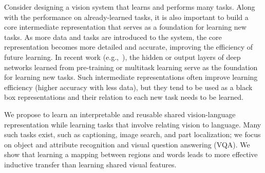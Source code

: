 \documentclass[10pt,twocolumn,letterpaper]{article}
\begin{document}
    

Consider designing a vision system that learns and performs many tasks.  Along with the performance on already-learned tasks, it is also important to build a core intermediate representation that serves as a foundation for learning new tasks.  As more data and tasks are introduced to the system, the core representation becomes more detailed and accurate, improving the efficiency of future learning.  In recent work (e.g.,~\cite{li2016learning,lu2016hierarchical,jabri2016revisiting,fukui2016multimodal,shih2016look,ilievski2016focused}), the hidden or output layers of deep networks learned from pre-training or multitask learning serve as the foundation for learning new tasks.  Such intermediate representations often improve learning efficiency (higher accuracy with less data), but they tend to be used as a black box representations and their relation to each new task needs to be learned.



We propose to learn an interpretable and reusable shared vision-language representation while learning tasks that involve relating vision to language.  Many such tasks exist, such as captioning, image search, and part localization; we focus on object and attribute recognition and visual question answering (VQA). We show that learning a mapping between regions and words leads to more effective inductive transfer than learning shared visual features.   
\end{document}
